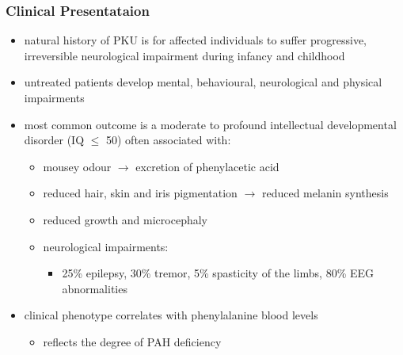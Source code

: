 \documentclass{scrartcl}
\begin{document}
\subsubsection{Clinical Presentataion}
\label{sec:orgf9a3e57}
\begin{itemize}
\item natural history of PKU is for affected individuals to suffer
progressive, irreversible neurological impairment during infancy and
childhood
\item untreated patients develop mental, behavioural, neurological and
physical impairments
\item most common outcome is a moderate to profound intellectual
developmental disorder (IQ \(\le\) 50) often associated with:
\begin{itemize}
\item mousey odour \(\to\) excretion of phenylacetic acid
\item reduced hair, skin and iris pigmentation \(\to\) reduced melanin synthesis
\item reduced growth and microcephaly
\item neurological impairments:
\begin{itemize}
\item 25\% epilepsy, 30\% tremor, 5\% spasticity of the limbs, 80\% EEG abnormalities
\end{itemize}
\end{itemize}
\item clinical phenotype correlates with phenylalanine blood levels
\begin{itemize}
\item reflects the degree of PAH deficiency
\end{itemize}
\end{itemize}
\end{document}
